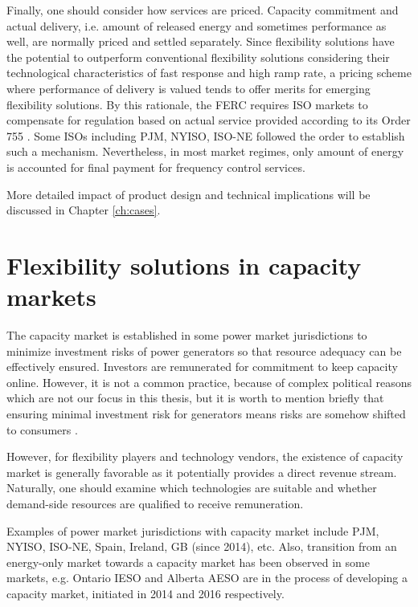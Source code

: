 Finally, one should consider how services are priced. Capacity commitment and actual delivery, i.e. amount of released energy and sometimes performance as well, are normally priced and settled separately. Since flexibility solutions have the potential to outperform conventional flexibility solutions considering their technological characteristics of fast response and high ramp rate, a pricing scheme where performance of delivery is valued tends to offer merits for emerging flexibility solutions. By this rationale, the FERC requires ISO markets to compensate for regulation based on actual service provided
according to its Order 755 \cite{FERC755}. Some ISOs including PJM, NYISO, ISO-NE followed the order to establish such a mechanism. Nevertheless, in most market regimes, only amount of energy is accounted for final payment for frequency control services.

More detailed impact of product design and  technical implications will be discussed in Chapter \ref{ch:cases}.

\section[Flexibility solutions in capacity markets]{Flexibility solutions in capacity markets%
	}
\label{sec:CM}

The capacity market is established in some power market jurisdictions to minimize investment risks of power generators so that resource adequacy can be effectively ensured. Investors are remunerated for commitment to keep capacity online. However, it is not a common practice, because of complex political reasons which are not our focus in this thesis, but it is worth to mention briefly that ensuring minimal investment risk for generators means risks are somehow shifted to consumers \cite{Cochran2013}. 

However, for flexibility players and technology vendors, the existence of capacity market is generally favorable as it potentially provides a direct revenue stream. Naturally, one should examine which technologies are suitable and whether demand-side resources are qualified to receive remuneration.

Examples of power market jurisdictions with capacity market include PJM, NYISO, ISO-NE, Spain, Ireland, GB (since 2014), etc. Also, transition from an energy-only market towards a capacity market has been observed in some markets, e.g. Ontario IESO and Alberta AESO are in the process of developing a capacity market, initiated in 2014 and 2016 respectively. 


